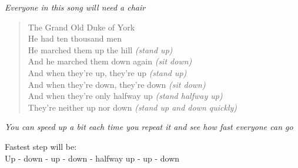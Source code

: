 
\textit{Everyone in this song will need a chair}

\begin{verse}
The Grand Old Duke of York \\

He had ten thousand men \\

He marched them up the hill \textit{(stand up)} \\

And he marched them down again \textit{(sit down)} \\

And when they're up, they're up \textit{(stand up)} \\

And when they're down, they're down \textit{(sit down)} \\

And when they're only halfway up \textit{(stand halfway up)} \\

They're neither up nor down \textit{(stand up and down quickly)} \\
\end{verse}

\textit{You can speed up a bit each time you repeat it and see how fast everyone can go}

Fastest step will be: \\
Up - down - up - down - halfway up - up - down
